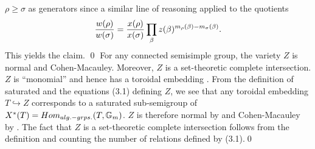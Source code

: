 $\rho \geq\sigma$ as generators since a similar line of reasoning applied
to the quotients
$$
{w(\rho)\over w(\sigma)}={x(\rho)\over x(\sigma)}\prod_\beta
z(\beta)^{m_\rho(\beta)-m_{\sigma}(\beta)}.
$$
This yields the claim. \qed
\enddemo
{} For any connected semisimple group,
the variety $Z$ is normal and Cohen-Macauley.
Moreover, $Z$ is a set-theoretic complete intersection.
\endproclaim
{} $Z$ is ``monomial'' and hence has a toroidal
embedding \cite{K, Ch I}. From the definition of saturated
\cite{K, Ch I, Definition 2} and the equations (3.1)
defining $Z$, we see that any toroidal embedding 
$T\hookrightarrow Z$ corresponds to a saturated sub-semigroup of 
$X^*(T)=Hom_{alg.-grps.}(T,{\Bbb G}_m)$. $Z$ is therefore
normal by \cite{K, Ch I, Theorem 1} and Cohen-Macauley
by \cite{K, Ch I, Theorem 14}.
The fact that $Z$ is a set-theoretic 
complete intersection follows from the definition
and counting the number of relations defined by (3.1).\qed
\enddemo
\enddocument
